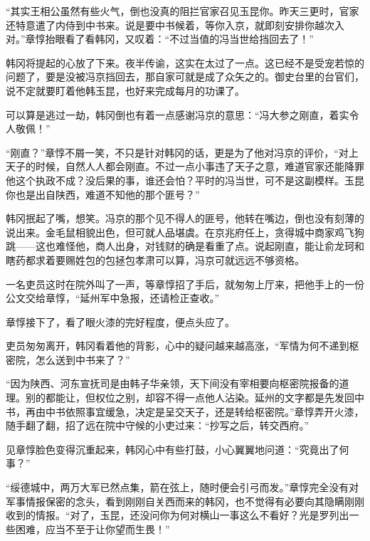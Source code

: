 “其实王相公虽然有些火气，倒也没真的阻拦官家召见玉昆你。昨天三更时，官家还特意遣了内侍到中书来。说是要中书候着，等你入京，就即刻安排你越次入对。”章惇抬眼看了看韩冈，又叹着：“不过当值的冯当世给挡回去了！”

韩冈将提起的心放了下来。夜半传谕，这实在太过了一点。这已经不是受宠若惊的问题了，要是没被冯京挡回去，那自家可就是成了众矢之的。御史台里的台官们，说不定就要盯着他韩玉昆，也好来完成每月的功课了。

可以算是逃过一劫，韩冈倒也有着一点感谢冯京的意思：“冯大参之刚直，着实令人敬佩！”

“刚直？”章惇不屑一笑，不只是针对韩冈的话，更是为了他对冯京的评价，“对上天子的时候，自然人人都会刚直。不过一点小事违了天子之意，难道官家还能降罪他这个执政不成？没后果的事，谁还会怕？平时的冯当世，可不是这副模样。玉昆你也是出自陕西，难道不知他的那个匪号？”

韩冈抿起了嘴，想笑。冯京的那个见不得人的匪号，他转在嘴边，倒也没有刻薄的说出来。金毛鼠相貌出色，但可就人品堪虞。在京兆府任上，贪得城中商家鸡飞狗跳——这也难怪他，商人出身，对钱财的确是看重了点。说起刚直，能让俞龙珂和瞎药都求着要赐姓包的包拯包孝肃可以算，冯京可就远远不够资格。

一名吏员这时在院外叫了一声，等章惇招了手后，就匆匆上厅来，把他手上的一份公文交给章惇，“延州军中急报，还请检正查收。”

章惇接下了，看了眼火漆的完好程度，便点头应了。

吏员匆匆离开，韩冈看着他的背影，心中的疑问越来越高涨，“军情为何不递到枢密院，怎么送到中书来了？”

“因为陕西、河东宣抚司是由韩子华亲领，天下间没有宰相要向枢密院报备的道理。别的都能让，但权位之别，却容不得一点他人沾染。延州的文字都是先发回中书，再由中书依照事宜缓急，决定是呈交天子，还是转给枢密院。”章惇弄开火漆，随手翻了翻，招了远在院中守候的小吏过来：“抄写之后，转交西府。”

见章惇脸色变得沉重起来，韩冈心中有些打鼓，小心翼翼地问道：“究竟出了何事？”

“绥德城中，两万大军已然点集，箭在弦上，随时便会引弓而发。”章惇完全没有对军事情报保密的念头，看到刚刚自关西而来的韩冈，也不觉得有必要向其隐瞒刚刚收到的情报。“对了，玉昆，还没问你为何对横山一事这么不看好？光是罗列出一些困难，应当不至于让你望而生畏！”

